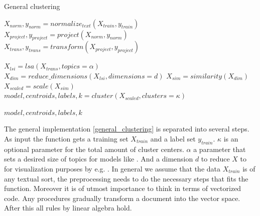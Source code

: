     \begin{algorithm}[H]
    \begin{algorithmic}[1]
      \caption{General clustering}\label{general_clustering}
        \State $X_{norm},y_{norm} = normalize_{text}(X_{train},y_{train})$
        \State $X_{project},y_{project} = project(X_{norm},y_{norm})$
        \State $X_{trans},y_{trans} = transform(X_{project},y_{project})$

        \State $X_{lsi} = lsa(X_{trans}, topics=\alpha)$
        \State $X_{dim} = reduce\_dimensions(X_{lsi}, dimensions=d)$
        \State $X_{sim} = similarity(X_{dim})$
        \State $X_{scaled} = scale(X_{sim})$
        \State $model,centroids,labels,k = cluster(X_{scaled}, clusters=\kappa)$

        \State \Return $model,centroids,labels,k$
      \EndFunction
    \end{algorithmic}
    \end{algorithm}

  The general implementation \ref{general_clustering} is separated into several steps. As input the function gets a training set $X_{train}$ and a label set $y_{train}$. $\kappa$ is an optional parameter for the total amount of cluster centers. $\alpha$ a parameter that sets a desired size of topics for models like \lsa{}. And a dimension $d$ to reduce $X$ to for visualization purposes by e.g. \pca{}. In general we assume that the data $X_{train}$ is of any textual sort, the preprocessing needs to do the necessary steps that fits the function. Moreover it is of utmost importance to think in terms of vectorized code. Any procedures gradually transform a document into the vector space. After this all rules by linear algebra hold.

